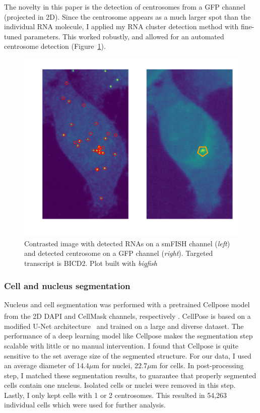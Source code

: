The novelty in this paper is the detection of centrosomes from a \ac{GFP} channel (projected in 2D).
Since the centrosome appears as a much larger spot than the individual \ac{RNA} molecule, I applied my \ac{RNA} cluster detection method with fine-tuned parameters.
This worked robustly, and allowed for an automated centrosome detection (Figure~\ref{fig:centrosomes}).

\begin{figure}[]
    \centering
    \includegraphics[width=\textwidth]{figures/chapter5/centrosomes}
    \caption[RNA and centrosome detection results]{Contrasted image with detected RNAs on a smFISH channel (\textit{left}) and detected centrosome on a GFP channel (\textit{right}).
	Targeted transcript is BICD2.
	Plot built with \emph{bigfish}}
    \label{fig:centrosomes}
\end{figure}

\subsubsection{Cell and nucleus segmentation}

Nucleus and cell segmentation was performed with a pretrained Cellpose model~\cite{stringer_cellpose_2021} from the 2D DAPI and CellMask\textsuperscript{\texttrademark} channels, respectively .
CellPose is based on a modified U-Net architecture~\cite{Ronneberger_unet} and trained on a large and diverse dataset.
The performance of a deep learning model like Cellpose makes the segmentation step scalable with little or no manual intervention.
I found that Cellpose is quite sensitive to the set average size of the segmented structure.
For our data, I used an average diameter of 14.4$\mu$m  for nuclei, 22.7$\mu$m for cells.
In  post-processing step, I matched these segmentation results, to guarantee that properly segmented cells contain one nucleus.
Isolated cells or nuclei were removed in this step.
Lastly, I only kept cells with 1 or 2 centrosomes.
This resulted in 54,263 individual cells which were used for further analysis.

